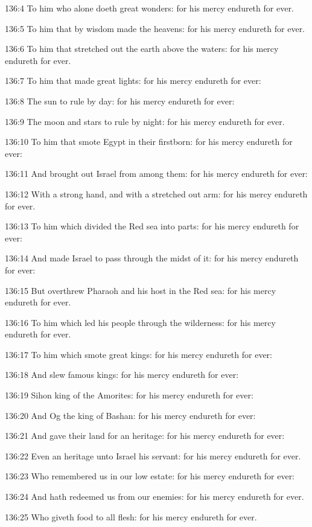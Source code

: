 136:4 To him who alone doeth great wonders: for his mercy endureth for ever.

136:5 To him that by wisdom made the heavens: for his mercy endureth for ever.

136:6 To him that stretched out the earth above the waters: for his mercy endureth for ever.

136:7 To him that made great lights: for his mercy endureth for ever:

136:8 The sun to rule by day: for his mercy endureth for ever:

136:9 The moon and stars to rule by night: for his mercy endureth for ever.

136:10 To him that smote Egypt in their firstborn: for his mercy endureth for ever:

136:11 And brought out Israel from among them: for his mercy endureth for ever:

136:12 With a strong hand, and with a stretched out arm: for his mercy endureth for ever.

136:13 To him which divided the Red sea into parts: for his mercy endureth for ever:

136:14 And made Israel to pass through the midst of it: for his mercy endureth for ever:

136:15 But overthrew Pharaoh and his host in the Red sea: for his mercy endureth for ever.

136:16 To him which led his people through the wilderness: for his mercy endureth for ever.

136:17 To him which smote great kings: for his mercy endureth for ever:

136:18 And slew famous kings: for his mercy endureth for ever:

136:19 Sihon king of the Amorites: for his mercy endureth for ever:

136:20 And Og the king of Bashan: for his mercy endureth for ever:

136:21 And gave their land for an heritage: for his mercy endureth for ever:

136:22 Even an heritage unto Israel his servant: for his mercy endureth for ever.

136:23 Who remembered us in our low estate: for his mercy endureth for ever:

136:24 And hath redeemed us from our enemies: for his mercy endureth for ever.

136:25 Who giveth food to all flesh: for his mercy endureth for ever.

